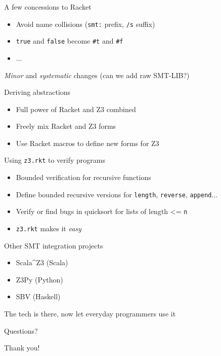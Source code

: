 \documentclass{beamer}
\begin{document}
\begin{frame}{A few concessions to Racket}
\begin{itemize}
\item Avoid name collisions (\texttt{smt:} prefix, \texttt{/s} suffix)
\item \texttt{true} and \texttt{false} become \texttt{\#t} and \texttt{\#f}
\item ...
\end{itemize}
\pause
\textit{Minor} and \textit{systematic} changes
\pause
(can we add raw SMT-LIB?)
\end{frame}

\begin{frame}{Deriving abstractions}
\begin{itemize}
\item Full power of Racket and Z3 combined
\item Freely mix Racket and Z3 forms
\pause
\item Use Racket macros to define new forms for Z3
\end{itemize}
\end{frame}

\begin{frame}{Using \texttt{z3.rkt} to verify programs}
\begin{itemize}
\item Bounded verification for recursive functions
\item Define bounded recursive versions for \texttt{length}, \texttt{reverse}, \texttt{append}...
\pause
\item Verify or find bugs in quicksort for lists of length <= \texttt{n}
\pause
\item \texttt{z3.rkt} makes it \textit{easy}
\end{itemize}
\end{frame}

\begin{frame}{Other SMT integration projects}
\begin{itemize}
\item Scala\textasciicircum Z3 (Scala)
\item Z3Py (Python)
\item SBV (Haskell)
\end{itemize}
\pause
The tech is there, now let everyday programmers use it
\end{frame}

\begin{frame}{Questions?}
\begin{center}
Thank you!
\end{center}
\end{frame}
\end{document}
